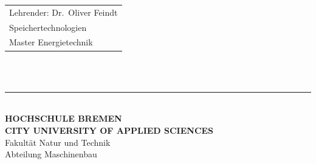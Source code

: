 \begin{titlepage}
    \vspace{5cm}
  
    \hspace*{37mm}
    \begin{minipage}{0.5\linewidth}
      \begin{tabular}{@{}l}
        Lehrender: Dr.\ Oliver Feindt \\
        Speichertechnologien  \\
        Master Energietechnik \\
      \end{tabular}\\
  
      \,\rule{9mm}{1mm}\\[1.5mm]
  
      \textbf{HOCHSCHULE BREMEN}\\
      \textbf{CITY UNIVERSITY OF APPLIED SCIENCES}\\
      Fakultät Natur und Technik\\
      Abteilung Maschinenbau\\
    \end{minipage}
  \end{titlepage}
  \restoregeometry
  \thispagestyle{empty}
  